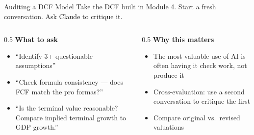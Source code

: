 \documentclass[aspectratio=169]{beamer}
\begin{document}
\begin{frame}{Auditing a DCF Model}
Take the DCF built in Module 4. Start a fresh conversation. Ask Claude to \alert{critique} it.
\vspace{0.3cm}
\begin{columns}[T]
\begin{column}{0.5\textwidth}
\textbf{What to ask}
\begin{itemize}\small
  \item ``Identify 3+ questionable assumptions''
  \item ``Check formula consistency --- does FCF match the pro formas?''
  \item ``Is the terminal value reasonable? Compare implied terminal growth to GDP growth.''
\end{itemize}
\end{column}
\begin{column}{0.5\textwidth}
\textbf{Why this matters}
\begin{itemize}\small
  \item The most valuable use of AI is often having it \alert{check} work, not produce it
  \item Cross-evaluation: use a second conversation to critique the first
  \item Compare original vs.\ revised valuations
\end{itemize}
\end{column}
\end{columns}
\end{frame}
\end{document}
